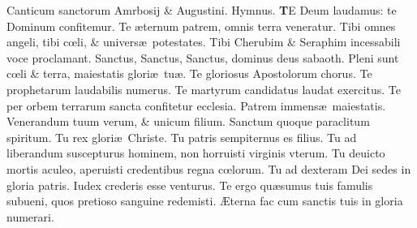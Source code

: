 \documentclass[a5paper,10pt]{book}
\def\ae{æ}
\def\AE{Æ}
\def\oe{œ}
\begin{document}
\begin{multicols*}{2}
\newline {} \color{red} Canticum sanctorum Amrbosij \& Augustini. Hymnus. \color{black}
\vspace{-1em}
\lettrine[lines=2]{\bfseries \color{red} T}{}E Deum laudamus: te Dominum confitemur.
\newline \color{red} T\color{black}e \ae ternum patrem, omnis terra veneratur.
\newline \color{red} T\color{black}ibi omnes angeli,  tibi c\oe li, \& univers\ae\ potestates.
\newline \color{red} T\color{black}ibi Cherubim \& Seraphim incessabili voce proclamant.
\newline \color{red} S\color{black}anctus, Sanctus, Sanctus, dominus deus sabaoth.
\newline \color{red} P\color{black}leni sunt c\oe li \& terra, maiestatis glori\ae \ tu\ae .
\newline \color{red} T\color{black}e gloriosus Apostolorum chorus.
\newline \color{red} T\color{black}e prophetarum laudabilis numerus.
\newline \color{red} T\color{black}e martyrum candidatus laudat exercitus.
\newline \color{red} T\color{black}e per orbem terrarum sancta confitetur ecclesia.
\newline \color{red} P\color{black}atrem  immens\ae \ maiestatis.
\newline \color{red} V\color{black}enerandum tuum verum, \& unicum filium.
\newline \color{red} S\color{black}anctum quoque paraclitum spiritum.
\newline \color{red} T\color{black}u rex glori\ae \ Christe.
\newline \color{red} T\color{black}u patris sempiternus es filius.
\newline \color{red} T\color{black}u ad liberandum suscepturus hominem, non horruisti virginis vterum.
\newline \color{red} T\color{black}u deuicto mortis aculeo, aperuisti credentibus regna c\oe lorum.
\newline \color{red} T\color{black}u ad dexteram Dei sedes in gloria patris.
\newline \color{red} I\color{black}udex crederis esse venturus.
\newline \color{red} T\color{black}e ergo qu\ae sumus tuis famulis subueni, quos pretioso sanguine redemisti.
\newline \color{red} \AE \color{black}terna fac cum sanctis tuis in gloria numerari.

\end{multicols*}
\end{document}
